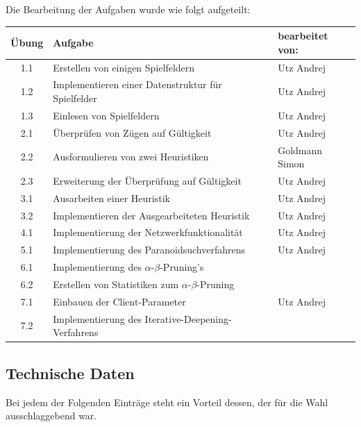 \documentclass[12pt,a4paper]{article}
\begin{document}
Die Bearbeitung der Aufgaben wurde wie folgt aufgeteilt:\newline
\begin{tabular}{|c|l|l|}
	\hline
	Übung & Aufgabe & bearbeitet von:\\
	\hline
	1.1 & Erstellen von einigen Spielfeldern & Utz Andrej\\
	1.2 & Implementieren einer Datenstruktur für Spielfelder & Utz Andrej\\
	1.3 & Einlesen von Spielfeldern & Utz Andrej\\
	\hline
	2.1 & Überprüfen von Zügen auf Gültigkeit & Utz Andrej\\
	2.2 & Ausformulieren von zwei Heuristiken & Goldmann Simon\\
	2.3 & Erweiterung der Überprüfung auf Gültigkeit & Utz Andrej\\
	\hline
	3.1 & Ausarbeiten einer Heuristik & Utz Andrej\\
	3.2 & Implementieren der Ausgearbeiteten Heuristik & Utz Andrej\\
	\hline
	4.1 & Implementierung der Netzwerkfunktionalität & Utz Andrej\\
	\hline
	5.1 & Implementierung des Paranoidsuchverfahrens & Utz Andrej\\
	\hline
	6.1 & Implementierung des $\alpha$-$\beta$-Pruning's & \\
	6.2 & Erstellen von Statistiken zum $\alpha$-$\beta$-Pruning & \\
	\hline
	7.1 & Einbauen der Client-Parameter & Utz Andrej\\
	7.2 & Implementierung des Iterative-Deepening-Verfahrens & \\
	\hline
\end{tabular}
\newpage

\subsection{Technische Daten}
Bei jedem der Folgenden Einträge steht ein Vorteil dessen, der für die Wahl ausschlaggebend war.
\end{document}
